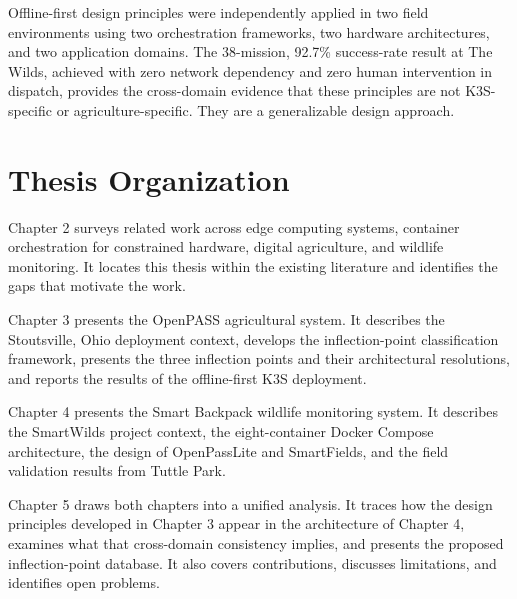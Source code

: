 Offline-first design principles were independently applied in two field environments using two orchestration frameworks, two hardware architectures, and two application domains. The 38-mission, 92.7\% success-rate result at The Wilds, achieved with zero network dependency and zero human intervention in dispatch, provides the cross-domain evidence that these principles are not K3S-specific or agriculture-specific. They are a generalizable design approach.
\section{Thesis Organization}
\label{sec:thesis_org}
Chapter 2 surveys related work across edge computing systems, container orchestration for constrained hardware, digital agriculture, and wildlife monitoring. It locates this thesis within the existing literature and identifies the gaps that motivate the work.

Chapter 3 presents the OpenPASS agricultural system. It describes the Stoutsville, Ohio deployment context, develops the inflection-point classification framework, presents the three inflection points and their architectural resolutions, and reports the results of the offline-first K3S deployment.

Chapter 4 presents the Smart Backpack wildlife monitoring system. It describes the SmartWilds project context, the eight-container Docker Compose architecture, the design of OpenPassLite and SmartFields, and the field validation results from Tuttle Park.

Chapter 5 draws both chapters into a unified analysis. It traces how the design principles developed in Chapter 3 appear in the architecture of Chapter 4, examines what that cross-domain consistency implies, and presents the proposed inflection-point database. It also covers contributions, discusses limitations, and identifies open problems.